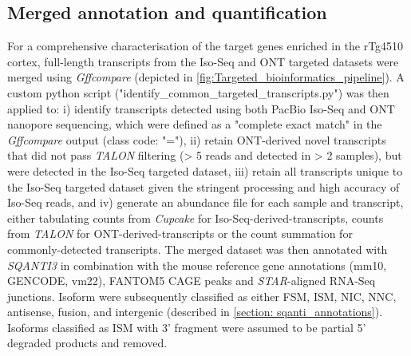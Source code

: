 \subsection{Merged annotation and quantification}
\label{ch6: methods_quantification}
For a comprehensive characterisation of the target genes enriched in the rTg4510 cortex, full-length transcripts from the Iso-Seq and ONT targeted datasets were merged using \textit{Gffcompare} (depicted in \cref{fig:Targeted_bioinformatics_pipeline}). A custom python script ("identify\_common\_targeted\_transcripts.py") was then applied to: i) identify transcripts detected using both PacBio Iso-Seq and ONT nanopore sequencing, which were defined as a "complete exact match" in the \textit{Gffcompare} output (class code: "="), ii) retain ONT-derived novel transcripts that did not pass \textit{TALON} filtering (> 5 reads and detected in > 2 samples), but were detected in the Iso-Seq targeted dataset, iii) retain all transcripts unique to the Iso-Seq targeted dataset given the stringent processing and high accuracy of Iso-Seq reads, and iv) generate an abundance file for each sample and transcript, either tabulating counts from \textit{Cupcake} for Iso-Seq-derived-transcripts, counts from \textit{TALON} for ONT-derived-transcripts or the count summation for commonly-detected transcripts. The merged dataset was then annotated with \textit{SQANTI3} in combination with the mouse reference gene annotations (mm10, GENCODE, vm22), FANTOM5 CAGE peaks and \textit{STAR}-aligned RNA-Seq junctions. Isoform were subsequently classified as either FSM, ISM, NIC, NNC, antisense, fusion, and intergenic (described in \cref{section: sqanti_annotations}). Isoforms classified as ISM with 3' fragment were assumed to be partial 5' degraded products and removed. 

